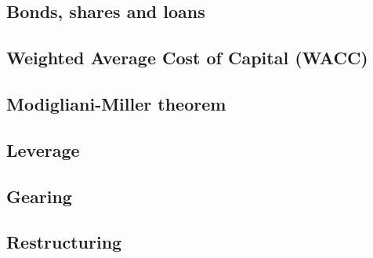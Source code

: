 
\subsection{Bonds, shares and loans}

\subsection{Weighted Average Cost of Capital (WACC)}

\subsection{Modigliani-Miller theorem}

\subsection{Leverage}

\subsection{Gearing}

\subsection{Restructuring}


